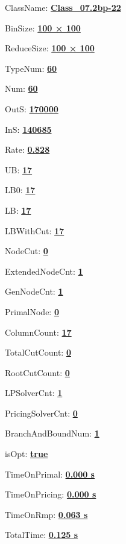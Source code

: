 \documentclass[11pt]{article}
\begin{document}
\pagestyle{empty}


ClassName: \underline{\textbf{Class_07.2bp-22}}
\par
BinSize: \underline{\textbf{100 × 100}}
\par
ReduceSize: \underline{\textbf{100 × 100}}
\par
TypeNum: \underline{\textbf{60}}
\par
Num: \underline{\textbf{60}}
\par
OutS: \underline{\textbf{170000}}
\par
InS: \underline{\textbf{140685}}
\par
Rate: \underline{\textbf{0.828}}
\par
UB: \underline{\textbf{17}}
\par
LB0: \underline{\textbf{17}}
\par
LB: \underline{\textbf{17}}
\par
LBWithCut: \underline{\textbf{17}}
\par
NodeCut: \underline{\textbf{0}}
\par
ExtendedNodeCnt: \underline{\textbf{1}}
\par
GenNodeCnt: \underline{\textbf{1}}
\par
PrimalNode: \underline{\textbf{0}}
\par
ColumnCount: \underline{\textbf{17}}
\par
TotalCutCount: \underline{\textbf{0}}
\par
RootCutCount: \underline{\textbf{0}}
\par
LPSolverCnt: \underline{\textbf{1}}
\par
PricingSolverCnt: \underline{\textbf{0}}
\par
BranchAndBoundNum: \underline{\textbf{1}}
\par
isOpt: \underline{\textbf{true}}
\par
TimeOnPrimal: \underline{\textbf{0.000 s}}
\par
TimeOnPricing: \underline{\textbf{0.000 s}}
\par
TimeOnRmp: \underline{\textbf{0.063 s}}
\par
TotalTime: \underline{\textbf{0.125 s}}
\par
\newpage


\end{document}

